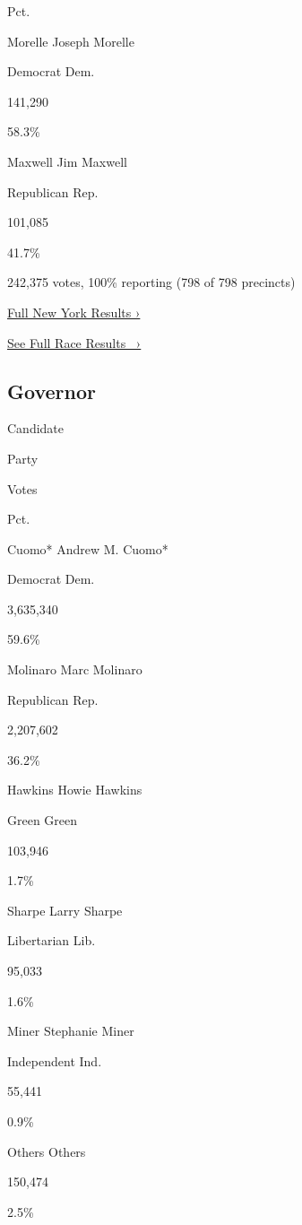 Pct.

 Morelle Joseph Morelle

Democrat Dem.

141,290

58.3\%

 Maxwell Jim Maxwell

Republican Rep.

101,085

41.7\%

242,375 votes, 100\% reporting (798 of 798 precincts)

\href{https://www.nytimes3xbfgragh.onion/interactive/2018/11/06/us/elections/results-new-york-elections.html}{Full
New York Results ›}

\href{https://www.nytimes3xbfgragh.onion/interactive/2018/11/06/us/elections/results-new-york-elections.html}{See
Full Race Results~ ›}

\hypertarget{governor}{%
\subsection{Governor}\label{governor}}

Candidate

Party

Votes

Pct.

 Cuomo* Andrew M. Cuomo*

Democrat Dem.

3,635,340

59.6\%

 Molinaro Marc Molinaro

Republican Rep.

2,207,602

36.2\%

 Hawkins Howie Hawkins

Green Green

103,946

1.7\%

 Sharpe Larry Sharpe

Libertarian Lib.

95,033

1.6\%

 Miner Stephanie Miner

Independent Ind.

55,441

0.9\%

 Others Others

150,474

2.5\%

